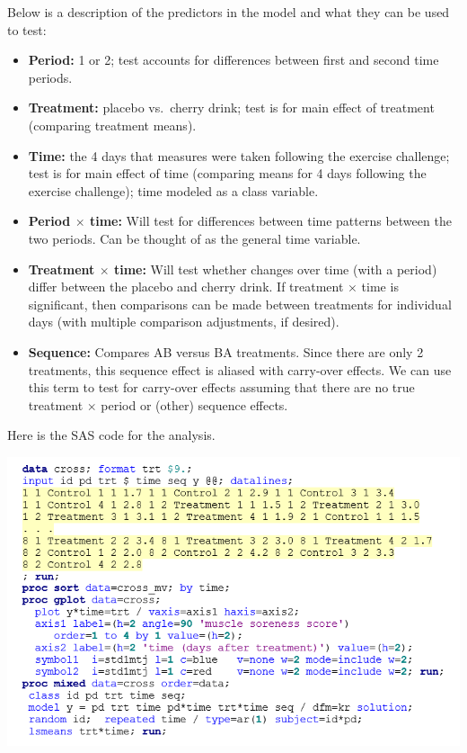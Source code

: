 \documentclass[
  9pt,
  ignorenonframetext,
]{beamer}
\providecommand{\tightlist}{%
  \setlength{\itemsep}{0pt}\setlength{\parskip}{0pt}}
\begin{document}
\begin{frame}{}
\protect\hypertarget{section-8}{}
Below is a description of the predictors in the model and what they can
be used to test:

\begin{itemize}
\tightlist
\item
  \textbf{Period:} 1 or 2; test accounts for differences between first
  and second time periods.
\item
  \textbf{Treatment:} placebo vs.~cherry drink; test is for main effect
  of treatment (comparing treatment means).
\item
  \textbf{Time:} the 4 days that measures were taken following the
  exercise challenge; test is for main effect of time (comparing means
  for 4 days following the exercise challenge); time modeled as a class
  variable.
\item
  \textbf{Period \(\times\) time:} Will test for differences between
  time patterns between the two periods. Can be thought of as the
  general time variable.
\item
  \textbf{Treatment \(\times\) time:} Will test whether changes over
  time (with a period) differ between the placebo and cherry drink. If
  treatment \(\times\) time is significant, then comparisons can be made
  between treatments for individual days (with multiple comparison
  adjustments, if desired).
\item
  \textbf{Sequence:} Compares AB versus BA treatments. Since there are
  only 2 treatments, this sequence effect is aliased with carry-over
  effects. We can use this term to test for carry-over effects assuming
  that there are no true treatment \(\times\) period or (other) sequence
  effects.
\end{itemize}
\end{frame}

\begin{frame}{Here is the SAS code for the analysis.}
\protect\hypertarget{here-is-the-sas-code-for-the-analysis.}{}
\begin{center}\includegraphics[width=1\linewidth]{figs_L11/f7} \end{center}
\end{frame}
\end{document}
